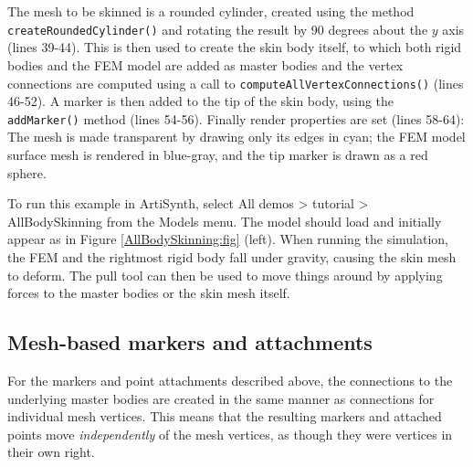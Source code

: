 The mesh to be skinned is a rounded cylinder, created using the
 method {\tt
createRoundedCylinder()} and rotating the result by 90 degrees about
the $y$ axis (lines 39-44). This is then used to create the skin body
itself, to which both rigid bodies and the FEM model are added as
master bodies and the vertex connections are computed using a call to
{\tt computeAllVertexConnections()} (lines 46-52). A marker is then
added to the tip of the skin body, using the {\tt addMarker()} method
(lines 54-56). Finally render properties are set (lines 58-64):
The mesh is made transparent by drawing only its edges in cyan; the
FEM model surface mesh is rendered in blue-gray, and the
tip marker is drawn as a red sphere.

To run this example in ArtiSynth, select {\sf All demos > tutorial >
AllBodySkinning} from the {\sf Models} menu. The model should load and
initially appear as in Figure \ref{AllBodySkinning:fig} (left). When
running the simulation, the FEM and the rightmost rigid body fall
under gravity, causing the skin mesh to deform. The pull tool
can then be used to move things around by applying forces to the
master bodies or the skin mesh itself.

\subsection{Mesh-based markers and attachments}

For the markers and point attachments described above, the connections
to the underlying master bodies are created in the same manner as
connections for individual mesh vertices. This means that the
resulting markers and attached points move {\it independently} of the
mesh vertices, as though they were vertices in their own right.

